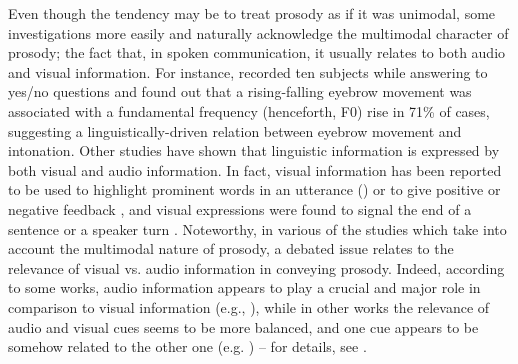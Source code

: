 \documentclass[output=paper]{langsci/langscibook}
\begin{document}
Even though the tendency may be to treat prosody as if it was unimodal, some investigations more easily and naturally acknowledge the multimodal character of prosody; the fact that, in spoken communication, it usually relates to both audio and visual information. For instance, \citet{Cave1996} recorded ten subjects while answering to yes\slash no questions and found out that a rising-falling eyebrow movement was associated with a fundamental frequency (henceforth, F0) rise in 71\% of cases, suggesting a linguistically-driven relation between eyebrow movement and intonation. Other studies have shown that linguistic information is expressed by both visual and audio information. In fact, visual information has been reported to be used to highlight prominent words in an utterance (\citealt{Krahmer2007,Swerts2008}) or to give positive or negative feedback \citep{Barkhuysen2005}, and  visual expressions were found to signal the end of a sentence or a speaker turn \citep{Barkhuysen2008}. Noteworthy, in various of the studies which take into account the multimodal nature of prosody, a debated issue relates to the relevance of visual vs. audio information in conveying prosody. Indeed, according to some works, audio information appears to play a crucial and major role in comparison to visual information (e.g., \citealt{House2002,Dijkstra2006,Dohen2009,Srinivasan2003}), while in other works the relevance of audio and visual cues seems to be more balanced, and one cue appears to be somehow related to the other one (e.g. \citealt{CrespoSendra2013}) -- for details, see .
\end{document}
